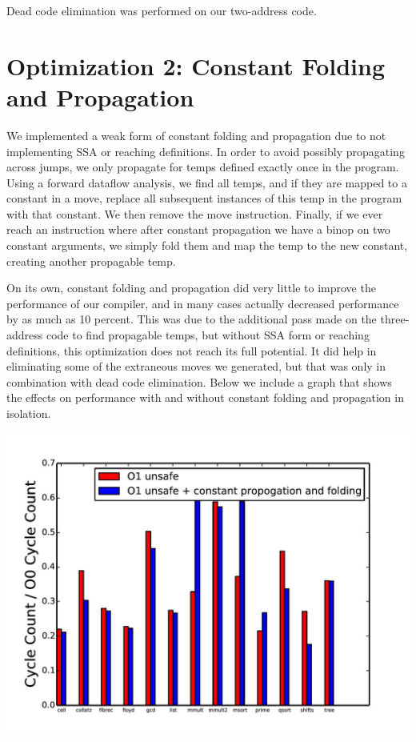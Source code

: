 \documentclass{article}
\begin{document}
Dead code elimination was performed on our two-address code.


\section{Optimization 2: Constant Folding and Propagation}

We implemented a weak form of constant folding and propagation due to not implementing SSA or reaching definitions. In order to avoid possibly propagating across jumps, we only propagate for temps defined exactly once in the program. Using a forward dataflow analysis, we find all temps, and if they are mapped to a constant in a move, replace all subsequent instances of this temp in the program with that constant. We then remove the move instruction. Finally, if we ever reach an instruction where after constant propagation we have a binop on two constant arguments, we simply fold them and map the temp to the new constant, creating another propagable temp.

On its own, constant folding and propagation did very little to improve the performance of our compiler, and in many cases actually decreased performance by as much as 10 percent. This was due to the additional pass made on the three-address code to find propagable temps, but without SSA form or reaching definitions, this optimization does not reach its full potential. It did help in eliminating some of the extraneous moves we generated, but that was only in combination with dead code elimination. Below we include a graph that shows the effects on performance with and without constant folding and propagation in isolation.

\includegraphics[scale=0.5]{O1_vs_constOpts-page-001}
\end{document}
